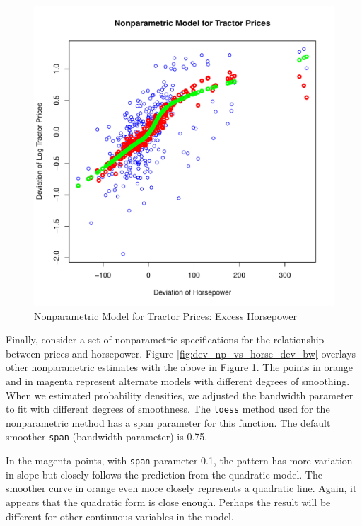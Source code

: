 \documentclass[11pt]{paper}
\begin{document}
\begin{figure}[h!]
  \centering
  \includegraphics[scale = 0.5, keepaspectratio=true]{../Figures/dev_np_vs_horse_dev}
  \caption{Nonparametric Model for Tractor Prices: Excess Horsepower} \label{fig:dev_np_vs_horse_dev}
\end{figure}

 

\clearpage
Finally, consider a set of nonparametric specifications for 
the relationship between prices and horsepower.
Figure \ref{fig:dev_np_vs_horse_dev_bw} 
overlays other nonparametric estimates with the above in 
Figure \ref{fig:dev_np_vs_horse_dev}.
The points in orange and in magenta represent
alternate models with different degrees of smoothing. 
%
When we estimated probability densities,
we adjusted the bandwidth parameter to fit
with different degrees of smoothness.
The \texttt{loess} method used for the nonparametric method has a span parameter for this function.
The default smoother \texttt{span} (bandwidth parameter) is 0.75.

In the magenta points, with \texttt{span} parameter 0.1, the pattern has more variation in slope but 
closely follows the prediction from the quadratic model. 
The smoother curve in orange 
even more closely represents a quadratic line. 
Again, it appears that the quadratic form
is close enough.
Perhaps the result will be different for other continuous variables in the model.
\end{document}

